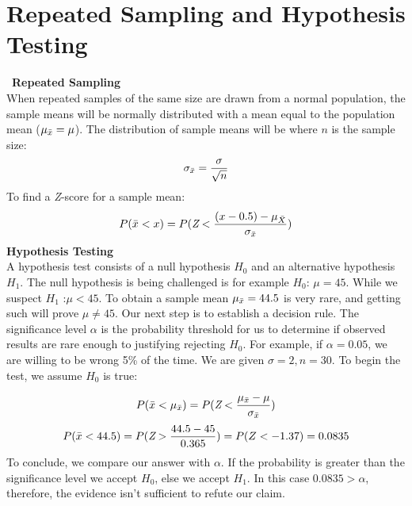 \documentclass{article}
\begin{document}
\section{Repeated Sampling and Hypothesis Testing}\
\large \textbf{Repeated Sampling}\\
When repeated samples of the same size are drawn from a normal population, the sample means will be normally distributed with a mean equal to the population mean (\(\mu_{\Bar{x}} = \mu\)). The distribution of sample means will be where \(n\) is the sample size:
\[\sigma_{\Bar{x}} = \frac{\sigma}{\sqrt{n}}\]
To find a \textit{Z}-score for a sample mean:
\[P(\Bar{x} < x) =  P(\textit{Z} < \frac{(x-0.5)-\mu_{\Bar{X}}}{\sigma_{\Bar{x}}})\]
\large \textbf{Hypothesis Testing}\\
A hypothesis test consists of a null hypothesis \(H_0\) and an alternative hypothesis \(H_1\). The null hypothesis is being challenged is for example \(H_0\): \(\mu = 45\). While we suspect \(H_1\) :\(\mu < 45\). To obtain a sample mean \(\mu_{\Bar{x}} = 44.5\) is very rare, and getting such will prove \(\mu \neq 45\).
Our next step is to establish a decision rule. The significance level \(\alpha\) is the probability threshold for us to determine if observed results are rare enough to justifying rejecting \(H_0\). For example, if \(\alpha = 0.05\), we are willing to be wrong 5\% of the time. We are given \(\sigma = 2, n = 30\). To begin the test, we assume \(H_0\) is true:

\[P(\Bar{x} < \mu_{\Bar{x}}) =  P(\textit{Z} < \frac{\mu_{\Bar{x}}-\mu}{\sigma_{\Bar{x}}})\]
\[P(\Bar{x} < 44.5) =  P(\textit{Z} > \frac{44.5-45}{0.365}) = P(Z < -1.37) = 0.0835\]
To conclude, we compare our answer with \(\alpha\). If the probability is greater than the significance level we accept \(H_0\), else we accept \(H_1\). In this case \(0.0835 > \alpha\), therefore, the evidence isn't sufficient to refute our claim.
\end{document}
